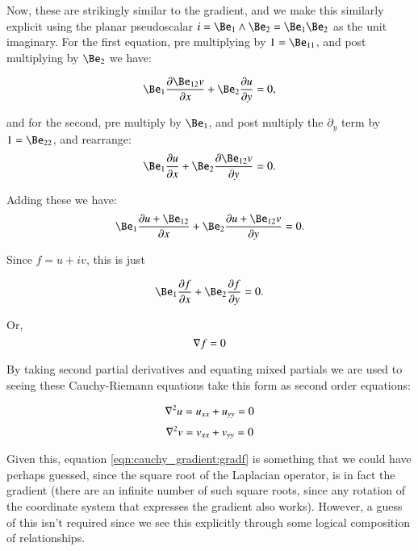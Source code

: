 Now, these are strikingly similar to the gradient, and we make this similarly explicit using the planar
pseudoscalar
$i=\Be_1 \wedge \Be_2 = \Be_1 \Be_2$
as the unit imaginary.  For the first equation, pre multiplying by $1 = \Be_{11}$, and post multiplying by $\Be_2$ we have:

\begin{equation*}
\Be_1 \frac{\partial \Be_{12} v}{\partial x} + \Be_{2}\frac{\partial u}{\partial y} = 0,
\end{equation*}

and for the second, pre multiply by $\Be_1$, and post multiply the $\partial_y$ term by $1 = \Be_{22}$, and rearrange:
\begin{equation*}
\Be_1 \frac{\partial u}{\partial x} + \Be_{2} \frac{\partial \Be_{12} v}{\partial y} = 0.
\end{equation*}

Adding these we have:
\begin{equation*}
\Be_1 \frac{\partial u + \Be_{12}}{\partial x} + \Be_{2} \frac{\partial u + \Be_{12} v}{\partial y} = 0.
\end{equation*}

Since $f = u + i v$, this is just

\begin{equation}
\Be_1 \frac{\partial f}{\partial x} + \Be_{2} \frac{\partial f}{\partial y} = 0.
\end{equation}

Or,
\begin{equation}\label{eqn:cauchy_gradient:gradf}
\nabla f = 0
\end{equation}

By taking second partial derivatives and equating mixed partials we are used to seeing these Cauchy-Riemann equations
take this form as second order equations:

\begin{equation}\label{eqn:cauchy_gradient:uxx}
\nabla^2 u = u_{xx} + u_{yy} = 0
\end{equation}
\begin{equation}
\nabla^2 v = v_{xx} + v_{yy} = 0
\end{equation}

Given this, equation \ref{eqn:cauchy_gradient:gradf} is something that we could have perhaps guessed, since the square root of the Laplacian operator, is in fact the gradient (there are an infinite number of such square roots, since any rotation of the coordinate system that expresses the gradient also works).  However, a guess of this isn't required since we see this explicitly through some logical composition of relationships.

